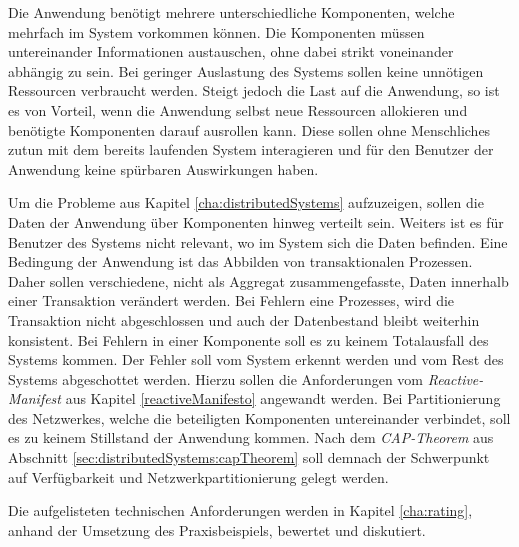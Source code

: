 \begin{enumerate}
    Die Anwendung benötigt mehrere unterschiedliche Komponenten, welche  mehrfach im System vorkommen können. Die Komponenten müssen untereinander Informationen austauschen, ohne dabei strikt voneinander abhängig zu sein.
    Bei geringer Auslastung des Systems sollen keine unnötigen Ressourcen verbraucht werden. Steigt jedoch die Last auf die Anwendung, so ist es von Vorteil, wenn die Anwendung selbst neue Ressourcen allokieren und benötigte Komponenten darauf ausrollen kann. Diese sollen ohne Menschliches zutun mit dem bereits laufenden System interagieren und für den Benutzer der Anwendung keine spürbaren Auswirkungen haben.

    Um die Probleme aus Kapitel \ref{cha:distributedSystems} aufzuzeigen, sollen die Daten der Anwendung über Komponenten hinweg verteilt sein. Weiters ist es für Benutzer des Systems nicht relevant, wo im System sich die Daten befinden. 
    Eine Bedingung der Anwendung ist das Abbilden von transaktionalen Prozessen. Daher sollen verschiedene, nicht als Aggregat zusammengefasste, Daten innerhalb einer Transaktion verändert werden. Bei Fehlern eine Prozesses, wird die Transaktion nicht abgeschlossen und auch der Datenbestand bleibt weiterhin konsistent.
    Bei Fehlern in einer Komponente soll es zu keinem Totalausfall des Systems kommen. Der Fehler soll vom System erkennt werden und vom Rest des Systems abgeschottet werden. Hierzu sollen die Anforderungen vom \textit{Reactive-Manifest} aus Kapitel \ref{reactiveManifesto} angewandt werden.
    Bei Partitionierung des Netzwerkes, welche die beteiligten Komponenten untereinander verbindet, soll es zu keinem Stillstand der Anwendung kommen. Nach dem \textit{CAP-Theorem} aus Abschnitt \ref{sec:distributedSystems:capTheorem} soll demnach der Schwerpunkt auf Verfügbarkeit und Netzwerkpartitionierung gelegt werden. 
\end{enumerate}
Die aufgelisteten technischen Anforderungen werden in Kapitel \ref{cha:rating}, anhand der Umsetzung des Praxisbeispiels, bewertet und diskutiert. 

